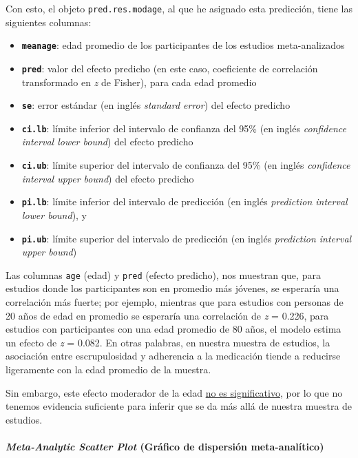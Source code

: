 \documentclass[
  bookmarksnumbered]{article}
\begin{document}
Con esto, el objeto \texttt{pred.res.modage}, al que he asignado esta predicción, tiene las siguientes columnas:

\begin{itemize}
\item
  \textbf{\texttt{meanage}}: edad promedio de los participantes de los estudios meta-analizados
\item
  \textbf{\texttt{pred}}: valor del efecto predicho (en este caso, coeficiente de correlación transformado en \emph{z} de Fisher), para cada edad promedio
\item
  \textbf{\texttt{se}}: error estándar (en inglés \emph{standard error}) del efecto predicho
\item
  \textbf{\texttt{ci.lb}}: límite inferior del intervalo de confianza del 95\% (en inglés \emph{confidence interval lower bound}) del efecto predicho
\item
  \textbf{\texttt{ci.ub}}: límite superior del intervalo de confianza del 95\% (en inglés \emph{confidence interval upper bound}) del efecto predicho
\item
  \textbf{\texttt{pi.lb}}: límite inferior del intervalo de predicción (en inglés \emph{prediction interval lower bound}), y
\item
  \textbf{\texttt{pi.ub}}: límite superior del intervalo de predicción (en inglés \emph{prediction interval upper bound})
\end{itemize}

Las columnas \texttt{age} (edad) y \texttt{pred} (efecto predicho), nos muestran que, para estudios donde los participantes son en promedio más jóvenes, se esperaría una correlación más fuerte; por ejemplo, mientras que para estudios con personas de 20 años de edad en promedio se esperaría una correlación de \emph{z} = 0.226, para estudios con participantes con una edad promedio de 80 años, el modelo estima un efecto de \emph{z} = 0.082. En otras palabras, en nuestra muestra de estudios, la asociación entre escrupulosidad y adherencia a la medicación tiende a reducirse ligeramente con la edad promedio de la muestra.

Sin embargo, este efecto moderador de la edad \underline{no es significativo}, por lo que no tenemos evidencia suficiente para inferir que se da más allá de nuestra muestra de estudios.

\hypertarget{meta-scatter}{%
\paragraph{\texorpdfstring{\emph{Meta-Analytic Scatter Plot} (Gráfico de dispersión meta-analítico)}{Meta-Analytic Scatter Plot (Gráfico de dispersión meta-analítico)}}\label{meta-scatter}}
\end{document}
